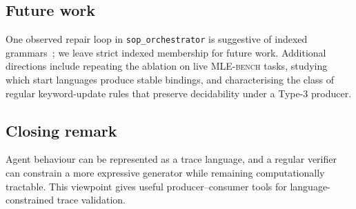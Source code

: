 \subsection{Future work}

One observed repair loop in \texttt{sop\_orchestrator} is suggestive
of indexed grammars~\cite{aho1968indexed}; we leave strict indexed
membership for future work.  Additional directions include repeating
the ablation on live \textsc{MLE-bench} tasks, studying which start
languages produce stable bindings, and characterising the class of
regular keyword-update rules that preserve decidability under a
Type-3 producer.

\subsection{Closing remark}

Agent behaviour can be represented as a trace language, and a
regular verifier can constrain a more expressive generator while
remaining computationally tractable.  This viewpoint gives useful
producer--consumer tools for language-constrained trace validation.
